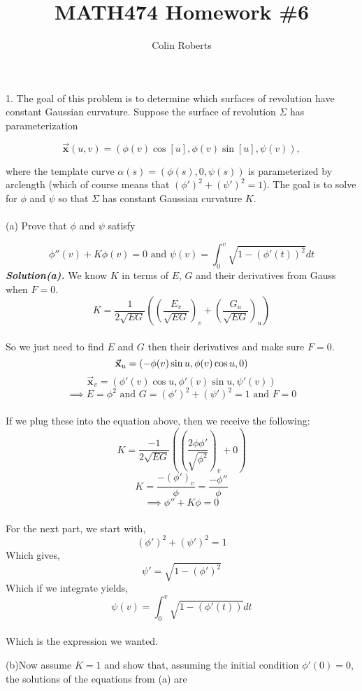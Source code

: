 \documentclass[11pt,letterpaper]{article}
\author{Colin Roberts}
\title{MATH474 Homework \#6}
\begin{document}
\maketitle
\pagebreak
\setlength{\parindent}{0cm}



1. The goal of this problem is to determine which surfaces of revolution have constant Gaussian curvature.  Suppose the surface of revolution $\Sigma$ has parameterization

\[\vec{\mathbf{x}}(u,v)=(\phi(v)\cos[u],\phi(v)\sin[u],\psi(v)),
\]

where the template curve $\alpha(s)=(\phi(s),0,\psi(s))$ is parameterized by arclength (which of course means that $(\phi')^2+(\psi')^2=1$).  The goal is to solve for $\phi$ and $\psi$ so that $\Sigma$ has constant Gaussian curvature $K$.
\\
\\

(a) Prove that $\phi$ and $\psi$ satisfy

\[\phi''(v)+K\phi(v)=0 \textrm{   and   } \psi(v)=\int_0^v\sqrt{1-(\phi'(t))^2}dt
\]
\textbf{\textit{Solution(a).}} We know $K$ in terms of $E$, $G$ and their derivatives from Gauss when $F=0$.
\\
\[K=\frac{1}{2\sqrt{EG}}\left(\left(\frac{E_v}{\sqrt{EG}}\right)_v+\left(\frac{G_u}{\sqrt{EG}}\right)_u\right)
\]
\\
So we just need to find $E$ and $G$ then their derivatives and make sure $F=0$.
\[
\vec{\mathbf{x}}_u=(-\phi(v)\sin{u},\phi(v)\cos{u},0)\\
\]
\[
\vec{\mathbf{x}}_v=(\phi'(v)\cos{u},\phi'(v)\sin{u},\psi'(v))
\]
\[
\implies E=\phi^2 \textrm{ and } G=(\phi')^2+(\psi')^2=1 \textrm{ and } F=0
\]
\\
If we plug these into the equation above, then we receive the following:
\[
K=\frac{-1}{2\sqrt{EG}}\left(\left(\frac{2\phi\phi'}{\sqrt{\phi^2}}\right)_v+0\right)
\]
\[
K=\frac{-\left(\phi'\right)_v}{\phi}=\frac{-\phi''}{\phi}
\]
\[\implies \phi''+K\phi=0
\]
\\
For the next part, we start with,
\[
(\phi')^2+(\psi')^2=1
\]
Which gives,
\[
\psi'=\sqrt{1-(\phi')^2}
\]
Which if we integrate yields,
\[
\psi(v)=\int_0^v\sqrt{1-(\phi'(t))}dt
\]
\\
Which is the expression we wanted.
\pagebreak

(b)Now assume $K=1$ and show that, assuming the initial condition $\phi'(0)=0$, the solutions of the equations from (a) are
\end{document}
